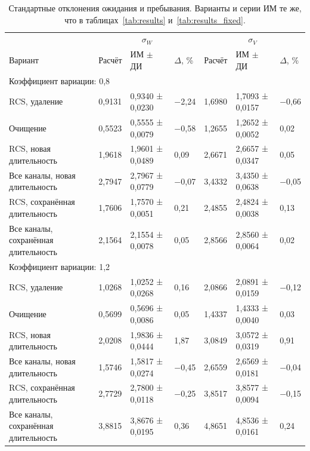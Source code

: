 \begin{table}[!htbp]
\centering\small\setlength{\tabcolsep}{2pt}
\begin{tabular}{@{}p{4.16cm}p{1.61cm}p{2.83cm}p{1.28cm}p{1.61cm}p{2.83cm}p{1.28cm}@{}}
\toprule
 & \multicolumn{3}{c}{$\sigma_W$} & \multicolumn{3}{c}{$\sigma_V$} \\
Вариант & Расчёт & ИМ $\pm$ ДИ & $\Delta$, \% & Расчёт & ИМ $\pm$ ДИ & $\Delta$, \% \\
\midrule
\multicolumn{7}{l}{Коэффициент вариации: 0,8} \\
RCS, удаление & 0,9131 & 0,9340 ± 0,0230 & −2,24 & 1,6980 & 1,7093 ± 0,0157 & −0,66 \\
Очищение & 0,5523 & 0,5555 ± 0,0079 & −0,58 & 1,2655 & 1,2652 ± 0,0052 & 0,02 \\
RCS, новая длительность & 1,9618 & 1,9601 ± 0,0489 & 0,09 & 2,6671 & 2,6657 ± 0,0347 & 0,05 \\
Все каналы, новая длительность & 2,7947 & 2,7967 ± 0,0779 & −0,07 & 3,4332 & 3,4350 ± 0,0638 & −0,05 \\
RCS, сохранённая длительность & 1,7606 & 1,7570 ± 0,0051 & 0,21 & 2,4855 & 2,4824 ± 0,0038 & 0,13 \\
Все каналы, сохранённая длительность & 2,1564 & 2,1554 ± 0,0078 & 0,05 & 2,8566 & 2,8560 ± 0,0064 & 0,02 \\
\multicolumn{7}{l}{Коэффициент вариации: 1,2} \\
RCS, удаление & 1,0268 & 1,0252 ± 0,0268 & 0,16 & 2,0866 & 2,0891 ± 0,0159 & −0,12 \\
Очищение & 0,5699 & 0,5696 ± 0,0086 & 0,05 & 1,4337 & 1,4333 ± 0,0040 & 0,03 \\
RCS, новая длительность & 2,0208 & 1,9836 ± 0,0444 & 1,87 & 3,0849 & 3,0572 ± 0,0319 & 0,91 \\
Все каналы, новая длительность & 1,5746 & 1,5817 ± 0,0274 & −0,45 & 2,6559 & 2,6569 ± 0,0181 & −0,04 \\
RCS, сохранённая длительность & 2,7729 & 2,7800 ± 0,0118 & −0,25 & 3,8517 & 3,8577 ± 0,0094 & −0,15 \\
Все каналы, сохранённая длительность & 3,8815 & 3,8676 ± 0,0195 & 0,36 & 4,8651 & 4,8536 ± 0,0161 & 0,24 \\
\bottomrule
\end{tabular}
\caption{Стандартные отклонения ожидания и пребывания. Варианты и серии ИМ те же, что в таблицах~\ref{tab:results} и~\ref{tab:results_fixed}.}
\label{tab:sd}
\end{table}

